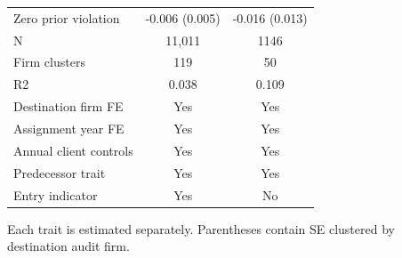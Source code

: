 \begin{table}[!htbp]
{\begin{tabular}{lcc}
Zero prior violation & -0.006 (0.005) & -0.016 (0.013) \\
N & 11,011 & 1146 \\
Firm clusters & 119 & 50 \\
R2 & 0.038 & 0.109 \\
Destination firm FE & Yes & Yes \\
Assignment year FE & Yes & Yes \\
Annual client controls & Yes & Yes \\
Predecessor trait & Yes & Yes \\
Entry indicator & Yes & No \\
\bottomrule
\end{tabular}}
\begin{minipage}{\textwidth}\footnotesize Each trait is estimated separately. Parentheses contain SE clustered by destination audit firm.\end{minipage}
\end{table}
